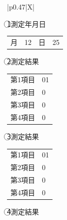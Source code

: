 \documentclass[UTF8,10pt,a4paper,fontset=fandol]{ctexart}
\newcommand{\fieldvalue}[1]{#1}
\newcommand{\handwritten}[1]{#1}
\begin{document}
\begin{tabularx}{\textwidth}{|p{0.47\textwidth}|X|}
\hline
{}\\
\hline
{\begin{minipage}[t]{\linewidth}
\textcircled{1}\quad 測定年月日

\vspace{0.4em}
\begin{tabularx}{\linewidth}{@{}lXlX@{}}
月&
\fieldvalue{\handwritten{12}}&
日&
\fieldvalue{\handwritten{25}}\\
\end{tabularx}

\vspace{0.7em}
\textcircled{2}\quad 測定結果

\begin{tabularx}{\linewidth}{@{}lX@{}}
第1項目&
\fieldvalue{\handwritten{01}}\\
第2項目&
\fieldvalue{\handwritten{0}}\\
第3項目&
\fieldvalue{\handwritten{0}}\\
第4項目&
\fieldvalue{\handwritten{0}}\\
\end{tabularx}

\vspace{0.7em}
\textcircled{3}\quad 測定結果

\begin{tabularx}{\linewidth}{@{}lX@{}}
第1項目&
\fieldvalue{\handwritten{01}}\\
第2項目&
\fieldvalue{\handwritten{0}}\\
第3項目&
\fieldvalue{\handwritten{0}}\\
第4項目&
\fieldvalue{\handwritten{0}}\\
\end{tabularx}

\vspace{0.7em}
\textcircled{4}\quad 測定結果


\end{minipage}}
\end{tabularx}
\end{document}
